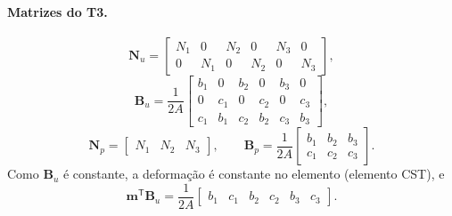 \documentclass[11pt,a4paper]{article}
\numberwithin{equation}{section}
\begin{document}
\paragraph{Matrizes do T3.}
\begin{equation}
\boxed{\mathbf N_u=\begin{bmatrix}
N_1&0&N_2&0&N_3&0\\
0&N_1&0&N_2&0&N_3
\end{bmatrix},}
\end{equation}
\begin{equation}
\boxed{\mathbf B_u=\frac{1}{2A}\begin{bmatrix}
b_1&0&b_2&0&b_3&0\\
0&c_1&0&c_2&0&c_3\\
c_1&b_1&c_2&b_2&c_3&b_3
\end{bmatrix},}
\end{equation}
\begin{equation}
\boxed{\mathbf N_p=\begin{bmatrix}N_1&N_2&N_3\end{bmatrix},\qquad
\mathbf B_p=\frac{1}{2A}\begin{bmatrix}
b_1&b_2&b_3\\
c_1&c_2&c_3
\end{bmatrix}.}
\end{equation}
Como $\mathbf B_u$ é constante, a deformação é constante no elemento
(elemento CST), e
\begin{equation}
\mathbf m^{\mathsf T}\mathbf B_u=\frac{1}{2A}\begin{bmatrix}b_1&c_1&b_2&c_2&b_3&c_3\end{bmatrix}.
\end{equation}
\end{document}

